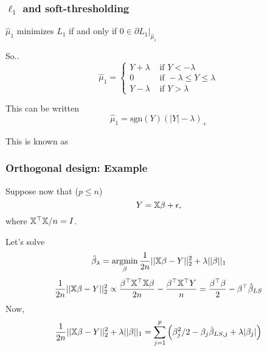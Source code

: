 \documentclass[12pt]{beamer}
\begin{document}
\begin{frame}
\frametitle{$\ell_1$ and soft-thresholding}

$\hat\mu_1$ minimizes $L_1$ if and only if $0 \in \partial L_1|_{\hat\mu_1}$
\vsp

So..
\[
\hat{\mu}_1 
=
\begin{cases}
Y + \lambda & \textrm{ if } Y < -\lambda \\
0 & \textrm{ if } -\lambda \leq Y \leq \lambda \\
Y - \lambda & \textrm{ if } Y > \lambda 
\end{cases}
\]

This can be written
\[
\hat{\mu}_1 = \textrm{sgn}(Y)(|Y| - \lambda)_+
\]

This is known as 
\end{frame}

\begin{frame}
\frametitle{Orthogonal design: Example}
Suppose now that ($p \leq n$)
\[
Y = \mathbb{X}\beta + \epsilon,
\]
where $\mathbb{X}^{\top} \mathbb{X}/n = I$.   

\vsp
Let's solve 
\[
\hat\beta_{\lambda} = \operatorname*{\arg\!\min}_{\beta} \frac{1}{2n}|| \mathbb{X} \beta - Y||_2^2 + \lambda ||\beta||_1
\]
\[
\frac{1}{2n}|| \mathbb{X} \beta - Y||_2^2 
\propto 
\frac{\beta^{\top}\mathbb{X}^{\top}\mathbb{X}\beta}{2n} - \frac{\beta^{\top}\mathbb{X}^{\top}Y}{n} 
=
\frac{\beta^{\top}\beta}{2} - \beta^{\top}\hat\beta_{LS}
\]
Now,
\[
\frac{1}{2n}|| \mathbb{X} \beta - Y||_2^2 + \lambda ||\beta||_1 
= 
\sum_{j=1}^p \left( \beta_j^2/2 - \beta_j \hat{\beta}_{LS,j} +\lambda |\beta_j|\right)
\]
\end{frame}
\end{document}
